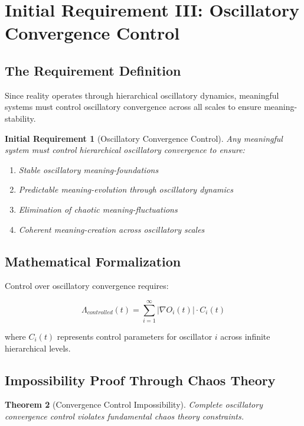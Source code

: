\documentclass[12pt,a4paper]{article}
\newtheorem{theorem}{Theorem}[section]
\newtheorem{requirement}[theorem]{Initial Requirement}
\begin{document}
\section{Initial Requirement III: Oscillatory Convergence Control}

\subsection{The Requirement Definition}

Since reality operates through hierarchical oscillatory dynamics, meaningful systems must control oscillatory convergence across all scales to ensure meaning-stability.

\begin{requirement}[Oscillatory Convergence Control]
Any meaningful system must control hierarchical oscillatory convergence to ensure:
\begin{enumerate}
\item Stable oscillatory meaning-foundations
\item Predictable meaning-evolution through oscillatory dynamics
\item Elimination of chaotic meaning-fluctuations
\item Coherent meaning-creation across oscillatory scales
\end{enumerate}
\end{requirement}

\subsection{Mathematical Formalization}

Control over oscillatory convergence requires:

$$\Lambda_{controlled}(t) = \sum_{i=1}^{\infty} |\nabla O_i(t)| \cdot C_i(t)$$

where $C_i(t)$ represents control parameters for oscillator $i$ across infinite hierarchical levels.

\subsection{Impossibility Proof Through Chaos Theory}

\begin{theorem}[Convergence Control Impossibility]
Complete oscillatory convergence control violates fundamental chaos theory constraints.
\end{theorem}
\end{document}
